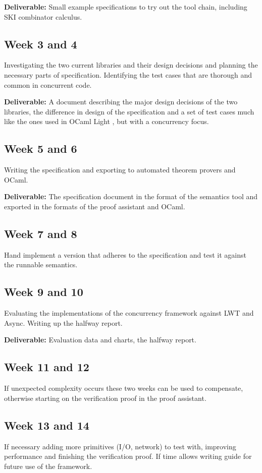 \textbf{Deliverable:} Small example specifications to try out the tool chain, including SKI combinator calculus.

\subsection{Week 3 and 4}
Investigating the two current libraries and their design decisions and planning the necessary parts of specification. Identifying the test cases that are thorough and common in concurrent code.

\textbf{Deliverable:} A document describing the major design decisions of the two libraries, the difference in design of the specification and a set of test cases much like the ones used in OCaml Light \cite{OCamlLight,OCamlLightWeb}, but with a concurrency focus.

\subsection{Week 5 and 6}
Writing the specification and exporting to automated theorem provers and OCaml.

\textbf{Deliverable:} The specification document in the format of the semantics tool and exported in the formats of the proof assistant and OCaml.


\subsection{Week 7 and 8}
Hand implement a version that adheres to the specification and test it against the runnable semantics.

\subsection{Week 9 and 10}
Evaluating the implementations of the concurrency framework against LWT and Async.
Writing up the halfway report.

\textbf{Deliverable:} Evaluation data and charts, the halfway report.
\subsection{Week 11 and 12}
If unexpected complexity occurs these two weeks can be used to compensate, otherwise starting on the verification proof in the proof assistant.
\subsection{Week 13 and 14}
If necessary adding more primitives (I/O, network) to test with, improving performance and finishing the verification proof. If time allows writing guide for future use of the framework.
